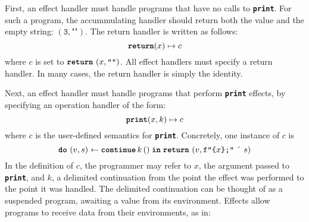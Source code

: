 First, an effect handler must handle programs that have no calls to \textbf{\texttt{print}}. For such a program, the accummulating handler should return both the value and the empty string: $(\texttt{3}, \texttt{""})$. The return handler is written as follows:
\[\textbf{\texttt{return}}(x) \mapsto {c}\]
where $c$ is set to $\texttt{\textbf{return}} \,\, {(x, \texttt{""})}$. All effect handlers must specify a return handler. In many cases, the return handler is simply the identity. 

Next, an effect handler must handle programs that perform \textbf{\texttt{print}} effects, by specifying an operation handler of the form:
\[\textbf{\texttt{print}}(x, k) \mapsto {c}\]
where $c$ is the user-defined semantics for \textbf{\texttt{print}}.
Concretely, one instance of $c$ is 
\[{\texttt{\textbf{do}} \,\, {(v, s)} \leftarrow {\textbf{\texttt{continue}} \, {k} \, {()}} \; \textbf{\texttt{in}} \; {\texttt{\textbf{return}} \,\, {(v, \texttt{f"\{$x$\};"} \text{ \^\ } s)}}}\]
In the definition of $c$, the programmer may refer to $x$, the argument passed to \textbf{\texttt{print}}, and $k$, a delimited continuation from the point the effect was performed to the point it was handled. The delimited continuation can be thought of as a suspended program, awaiting a value from its environment. Effects allow programs to receive data from their environments, as in:
